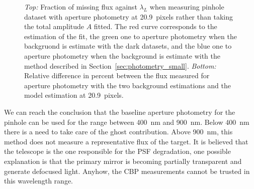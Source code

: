 \begin{figure}[h]
     \centering
     \caption{\textit{Top:} Fraction of missing flux against $\lambda_L$ when measuring \spinhole pinhole dataset with aperture photometry at \SI{20.9}{pixels} rather than taking the total amplitude $A$ fitted. The red curve corresponds to the estimation of the fit, the green one to aperture photometry when the backgruond is estimate with the dark datasets, and the blue one to aperture photometry when the background is estimate with the method described in Section~\ref{sec:photometry_small}. \textit{Bottom:} Relative difference in percent between the flux measured for aperture photometry with the two background estimations and the model estimation at \SI{20.9}{pixels}.}
     \label{fig:bias_aperture}
\end{figure}

%
% 
We can reach the conclusion that the baseline aperture photometry for the \spinhole pinhole can be used for the range between \SI{400}{\nano\meter} and \SI{900}{\nano\meter}. Below \SI{400}{\nano\meter} there is a need to take care of the ghost contribution. Above \SI{900}{\nano\meter}, this method does not measure a representative flux of the target. It is believed that the \SD telescope is the one responsible for the PSF degradation, one possible explanation is that the primary mirror is becoming partially transparent and generate defocused light. Anyhow, the CBP measurements cannot be trusted in this wavelength range. 



